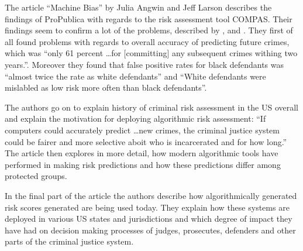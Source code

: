 The article \enquote{Machine Bias} by Julia Angwin and Jeff Larson describes the findings 
of ProPublica with regards to the risk assessment tool COMPAS. Their findings seem to confirm
a lot of the problems, described by \cite{barocas-hardt-narayanan}, \cite{Barocas.2016} and
\cite{Berk.2018}. They first of all found problems with regards to overall accuracy of 
predicting future crimes, which was \enquote{only 61 percent \dots for [committing] any 
subsequent crimes withing two years.}\cite{machinebias}. Moreover they found that false 
positive rates for black defendants was \enquote{almost twice the rate as white defendants}
\cite{machinebias} and \enquote{White defendants were mislabled as low risk more often 
than black defendants}.\cite{machinebias}

The authors go on to explain history of criminal risk assessment in the US overall and 
explain the motivation for deploying algorithmic risk assessment: \enquote{If computers
could accurately predict \dots new crimes, the criminal justice system could be fairer 
and more selective aboit who is incarcerated and for how long.}\cite{machinebias} The 
article then explores in more detail, how modern algorithmic tools have performed in 
making risk predictions and how these predictions differ among protected groups.

In the final part of the article the authors describe how algorithmically generated risk 
scores generated are being used today. They explain how these systems are deployed in 
various US states and jurisdictions and which degree of impact they have had on decision 
making processes of judges, prosecutes, defenders and other parts of the criminal justice 
system.